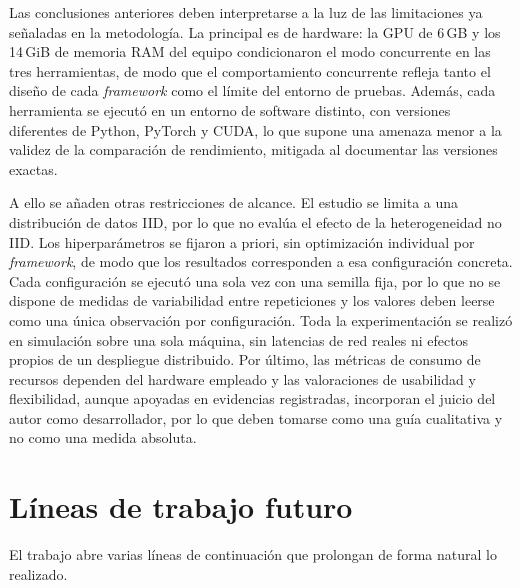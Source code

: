 Las conclusiones anteriores deben interpretarse a la luz de las limitaciones ya
señaladas en la metodología. La principal es de hardware: la GPU de 6\,GB y los 14\,GiB
de memoria RAM del equipo condicionaron el modo concurrente en las tres herramientas, de
modo que el comportamiento concurrente refleja tanto el diseño de cada \textit{framework} como el
límite del entorno de pruebas. Además, cada herramienta se ejecutó en un entorno de
software distinto, con versiones diferentes de Python, PyTorch y CUDA, lo que supone una
amenaza menor a la validez de la comparación de rendimiento, mitigada al documentar las
versiones exactas.

A ello se añaden otras restricciones de alcance. El estudio se limita a una distribución
de datos IID, por lo que no evalúa el efecto de la heterogeneidad no IID. Los
hiperparámetros se fijaron a priori, sin optimización individual por \textit{framework}, de modo
que los resultados corresponden a esa configuración concreta. Cada configuración se
ejecutó una sola vez con una semilla fija, por lo que no se dispone de medidas de
variabilidad entre repeticiones y los valores deben leerse como una única observación
por configuración. Toda la experimentación se realizó en simulación sobre una sola
máquina, sin latencias de red reales ni efectos propios de un despliegue distribuido.
Por último, las métricas de consumo de recursos dependen del hardware empleado y las
valoraciones de usabilidad y flexibilidad, aunque apoyadas en evidencias registradas,
incorporan el juicio del autor como desarrollador, por lo que deben tomarse como una
guía cualitativa y no como una medida absoluta.

\section{Líneas de trabajo futuro}
\label{sec:trabajo-futuro}

El trabajo abre varias líneas de continuación que prolongan de forma natural lo
realizado.

